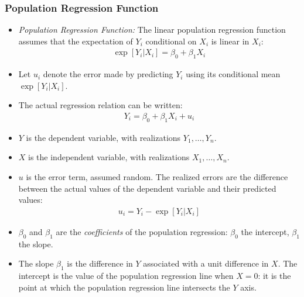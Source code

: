 \begin{frame}
\frametitle{Population Regression Function}
\begin{itemize}
\item \emph{Population Regression Function:}
The linear population regression function assumes that the expectation of $Y_i$ conditional on $X_i$ is linear in $X_i$:
\begin{align*}
\exp[Y_i|X_i] = \beta_0 + \beta_1 X_i
\end{align*}
\item Let $u_i$ denote the error made by predicting $Y_i$ using its conditional mean $\exp[Y_i|X_i]$. 
\item The actual regression relation can be written:
\begin{align*}
Y_i = \beta_0 + \beta_1 X_i + u_i
\end{align*}
\item $Y$ is the dependent variable, with realizations $Y_1, \ldots, Y_n$.
\item $X$ is the independent variable, with realizations $X_1, \ldots, X_n$.
\item $u$ is the error term, assumed random. The realized errors are the difference between the actual values of the dependent variable and their predicted values:
\begin{align*}
u_i = Y_i  - \exp[Y_i|X_i]
\end{align*}
\item $\beta_0$ and $\beta_1$ are the \emph{coefficients} of the population regression: $\beta_0$ the intercept, $\beta_1$ the slope. 
\item The slope $\beta_1$ is the difference in $Y$ associated with a unit difference in $X$. The intercept is the value of the population regression line when $X=0$: it is the point at which the population regression line intersects the $Y$ axis.
\end{itemize}
\end{frame}


